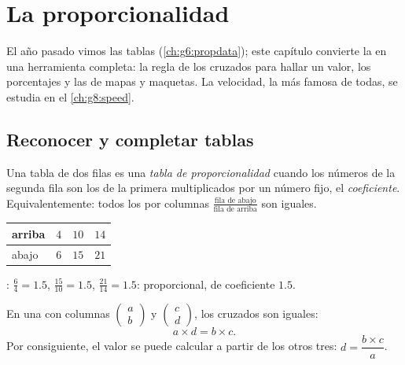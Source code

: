 \chapter{La proporcionalidad}\label{ch:g7:prop}

El año pasado vimos las tablas  (\cref{ch:g6:propdata}); este capítulo
convierte la  en una herramienta completa: la regla de los  cruzados para
hallar un  valor, los porcentajes y las  de mapas y maquetas.
La velocidad, la  más famosa de todas, se estudia en el
\cref{ch:g8:speed}.

\section{Reconocer y completar tablas}

\begin{definition}\label{def:g7:prop:table}
Una tabla de dos filas es una \emph{tabla de
proporcionalidad} cuando los números de la segunda fila son
los de la primera multiplicados por un número fijo, el
\emph{coeficiente}. Equivalentemente: todos los  por columnas
$\frac{\text{fila de abajo}}{\text{fila de arriba}}$ son iguales.
\end{definition}

\begin{example}\label{ex:g7:prop:recognize}
\begin{center}
\renewcommand{\arraystretch}{1.3}
\begin{tabular}{l|ccc}
arriba & $4$ & $10$ & $14$ \\
\hline
abajo & $6$ & $15$ & $21$ \\
\end{tabular}
\end{center}
: $\frac64 = 1.5$, $\frac{15}{10} = 1.5$,
$\frac{21}{14} = 1.5$: proporcional, de coeficiente $1.5$.
\end{example}

\begin{theorem}\label{thm:g7:prop:cross}
En una  con columnas $\begin{pmatrix} a \\ b
\end{pmatrix}$ y $\begin{pmatrix} c \\ d \end{pmatrix}$, los 
cruzados son iguales:
\[
a \times d = b \times c .
\]
Por consiguiente, el  valor se puede calcular a partir de los otros tres:
$d = \dfrac{b \times c}{a}$.
\end{theorem}

